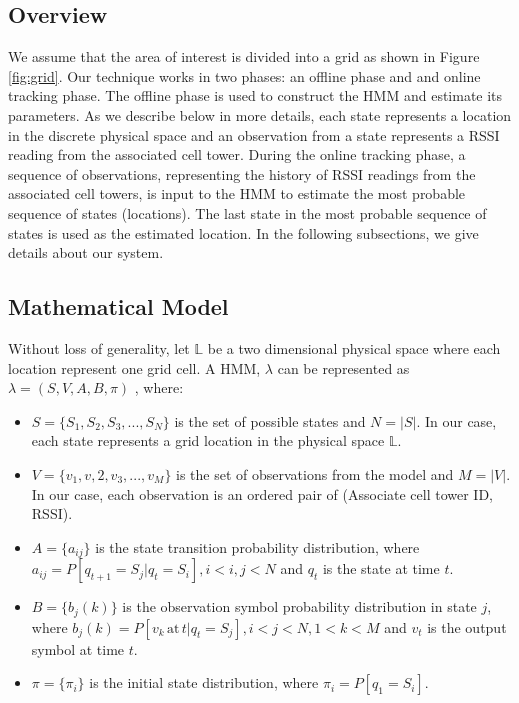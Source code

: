 \documentclass[conference]{IEEEtran}
\begin{document}
\subsection{Overview}
We assume that the area of interest is divided into a grid as shown
in Figure \ref{fig:grid}. Our technique works in two phases: an
offline phase and and online tracking phase. The offline phase is
used to construct the HMM and estimate its parameters. As we
describe below in more details, each state represents a location in
the discrete physical space and an observation from a state
represents a RSSI reading from the associated cell tower. During the
online tracking phase, a sequence of observations, representing the
history of RSSI readings from the associated cell towers, is input
to the HMM to estimate the
 most probable sequence of states (locations). The last state in the most probable
sequence of states is used as the estimated location. In the following subsections, we give details about our system.

\subsection{Mathematical Model}
Without loss of generality, let $\mathbb{L}$ be a two dimensional
physical space where each location represent one grid cell. A HMM,
$\lambda$ can be represented as $\lambda= (S, V, A, B, \pi)$
\cite{}, where:

\begin{itemize}
\item $S=\{S_1,S_2,S_3,...,S_{N}\}$ is the set of possible states and $N= |S|$.
In our case, each state represents a grid location in the physical
space $\mathbb{L}$.

\item $V=\{v_1,v,2,v_3,...,v_M\}$ is the set of observations from the
model  and $M= |V|$. In our case, each observation is an ordered
pair of (Associate cell tower ID, RSSI).

\item $A= \{a_{ij}\}$ is the state transition probability
distribution, where $a_{ij}= P[q_{t+1}= S_j|q_{t}= S_i], i<i, j< N$
and $q_t$ is the state at time $t$.

\item $B= \{b_j(k)\}$ is the observation symbol probability
distribution in state $j$, where $b_j(k)= P[v_k\, \mathrm{at}\,
t|q_{t}= S_j], i<j< N, 1<k<M$ and $v_t$ is the output symbol at time
$t$.

\item $\pi=\{\pi_i\}$ is the initial state distribution, where $\pi_i=P[q_1=S_i]$.
\end{itemize}
\end{document}
